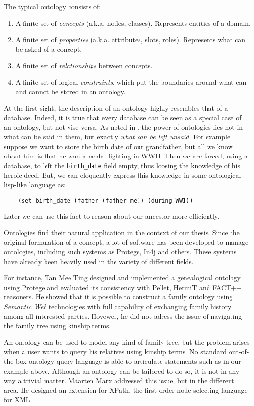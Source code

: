 The typical ontology consists of:
\begin{enumerate}
    \item{A finite set of \textit{concepts} (a.k.a. nodes, classes). Represents entities of a domain.}
    \item{A finite set of \textit{properties} (a.k.a. attributes, slots, roles). Represents what can be asked of a concept.}
    \item{A finite set of \textit{relationships} between concepts.}
    \item{A finite set of logical \textit{constraints}, which put the boundaries around what can and cannot be stored in an
        ontology.}
\end{enumerate}
At the first sight, the description of an ontology highly resembles that of a database. Indeed, it is true that every database can
be seen as a special case of an ontology, but not vise-versa. As noted in \cite{krhyp}, the power of ontologies lies not in what can
be said in them, but exactly \textit{what can be left unsaid}. For example, suppose we want to store the birth date of our
grandfather, but all we know about him is that he won a medal fighting in WWII.
Then we are forced, using a database, to left the \texttt{birth\_date} field empty, thus loosing the knowledge of his heroic deed.
But, we can eloquently express this knowledge in some ontological lisp-like language as:
\begin{verbatim}
    (set birth_date (father (father me)) (during WWI))
\end{verbatim}
Later we can use this fact to reason about our ancestor more efficiently.

Ontologies find their natural application in the context of our thesis.
Since the original formulation of a concept, a lot of software has been developed to manage ontologies, including such systems as
Protege, In4j and others. These systems have already been heavily used in the variety of different fields.

For instance, Tan Mee Ting \cite{tanfamily} designed and
implemented a genealogical ontology using Protege and evaluated its consistency with Pellet, HermiT and FACT++ reasoners. He
showed that it is possible to construct a family ontology using \textit{Semantic Web} \cite{web} technologies with full capability of
exchanging family history among all interested parties. Hovewer, he did not adress the issue of navigating the family tree using
kinship terms.

An ontology can be used to model any kind of family tree, but the problem arises when a user wants to query his relatives using
kinship terms. No standard out-of-the-box ontology query language is able to articulate statements such as in our example above.
Although an ontology can be tailored to do so, it is not in any way a trivial matter. Maarten Marx \cite{xcpath} addressed
this issue, but in the different area. He designed an extension for XPath, the first order node-selecting language for XML.

